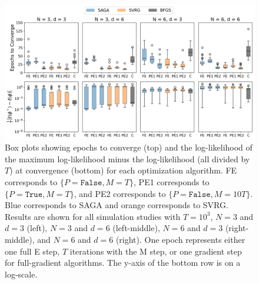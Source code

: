 \documentclass[12pt]{article}
\begin{document}
\begin{figure}[H]
    \centering
    \includegraphics[width=6.5in]{../plt/boxplots_sim_T_1000.png}
    \caption{Box plots showing epochs to converge (top) and the log-likelihood of the maximum log-likelihood minus the log-likelihood (all divided by $T$) at convergence (bottom) for each optimization algorithm. FE corresponds to $\{P = \texttt{False}, M = T\}$, PE1 corresponds to $\{P = \texttt{True}, M = T\}$, and PE2 corresponds to $\{P = \texttt{False}, M = 10T\}$. Blue corresponds to SAGA and orange corresponds to SVRG. Results are shown for all simulation studies with $T=10^{3}$, $N=3$ and $d=3$ (left), $N=3$ and $d=6$ (left-middle), $N=6$ and $d=3$ (right-middle), and $N=6$ and $d=6$ (right). One epoch represents either one full E step, $T$ iterations with the M step, or one gradient step for full-gradient algorithms. The y-axis of the bottom row is on a log-scale.}
    \label{fig:boxplots_sim}
\end{figure}
%
\end{document}
